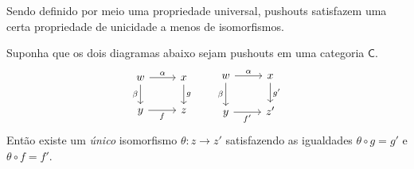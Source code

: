 Sendo definido por meio uma propriedade universal, pushouts satisfazem uma certa propriedade de unicidade a menos de isomorfismos.

\begin{prop}\label{prop:unicidade_pushout}
    Suponha que os dois diagramas abaixo sejam pushouts em uma categoria $\mathsf{C}$.
    \begin{displaymath}
        \begin{tikzcd}
            w
            \arrow[r, "\alpha"]
            \arrow[d, "\beta" swap]
            & x
            \arrow[d, "g"]
            \\ y
            \arrow[r, "f" swap]
            & z
        \end{tikzcd}
        \qquad
        \begin{tikzcd}
            w
            \arrow[r, "\alpha"]
            \arrow[d, "\beta" swap]
            & x
            \arrow[d, "g'"]
            \\ y
            \arrow[r, "f'" swap]
            & z'
        \end{tikzcd}
    \end{displaymath}
    Então existe um \emph{único} isomorfismo $\theta: z \to z'$ satisfazendo as igualdades $\theta \circ g = g'$ e $\theta \circ f = f'$.
\end{prop}


